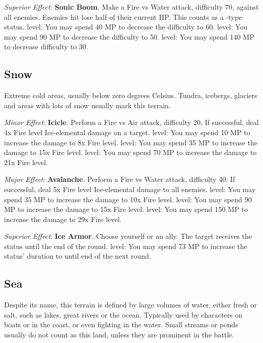 \begin{multicols}{2}
\textit{Superior Effect}: \textbf{Sonic Boom}. Make a Fire vs Water attack, difficulty 70, against all enemies. Enemies hit lose half of their current HP\@. This counts as a -type status.  level: You may spend 40 MP to decrease the difficulty to 60.  level: You may spend 90 MP to decrease the difficulty to 50.  level: You may spend 140 MP to decrease difficulty to 30.

\subsection*{Snow}\label{subsec:geo-snow}
Extreme cold areas, usually below zero degrees Celsius. Tundra, icebergs, glaciers and areas with lots of snow usually mark this terrain.

\textit{Minor Effect}: \textbf{Icicle}. Perform a Fire vs Air attack, difficulty 20. If successful, deal 4x Fire level Ice-elemental damage on a target.  level: You may spend 10 MP to increase the damage to 8x Fire level.  level: You may spend 35 MP to increase the damage to 15x Fire level.  level: You may spend 70 MP to increase the damage to 21x Fire level.

\textit{Major Effect}: \textbf{Avalanche}. Perform a Fire vs Water attack, difficulty 40. If successful, deal 5x Fire level Ice-elemental damage to all enemies.  level: You may spend 35 MP to increase the damage to 10x Fire level.  level: You may spend 90 MP to increase the damage to 15x Fire level.  level: You may spend 150 MP to increase the damage to 29x Fire level.

\textit{Superior Effect}: \textbf{Ice Armor}. Choose yourself or an ally. The target receives the  status until the end of the round.  level: You may spend 73 MP to increase the status’ duration to until end of the next round.

\subsection*{Sea}\label{subsec:geo-sea}
Despite its name, this terrain is defined by large volumes of water, either fresh or salt, such as lakes, great rivers or the ocean. Typically used by characters on boats or in the coast, or even fighting in the water. Small streams or ponds usually do not count as this land, unless they are prominent in the battle.


\end{multicols}
